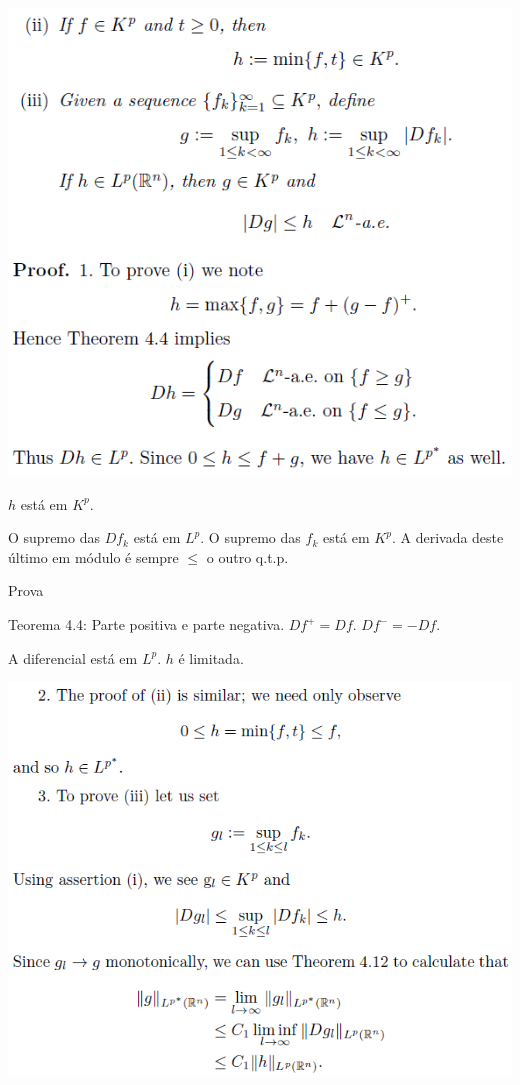 \documentclass[12pt]{article}
\begin{document}
		\begin{center}
		\includegraphics{5}
		\end{center}

$h$ est\'a em $K^p$.

O supremo das $Df_k$ est\'a em $L^p$. O supremo das $f_k$ est\'a em $K^p$. A derivada deste \'ultimo em m\'odulo \'e sempre $\le$ o outro q.t.p.

Prova

Teorema 4.4: Parte positiva e parte negativa. $Df^+ = Df.\,\,Df^- = - Df$.

A diferencial est\'a em $L^p$. $h$ \'e limitada.

\vspace{300mm}

		\begin{center}
		\includegraphics{6}
		\end{center}
\end{document}
